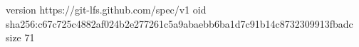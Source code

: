 version https://git-lfs.github.com/spec/v1
oid sha256:c67c725c4882af024b2e277261c5a9abaebb6ba1d7c91b14c8732309913fbadc
size 71

